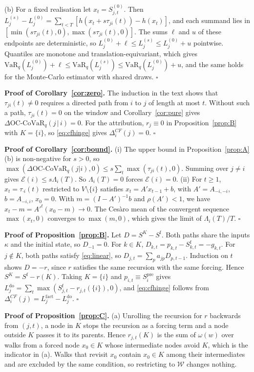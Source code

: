 \documentclass[referee,pdflatex,sn-mathphys-ay]{sn-jnl}
\theoremstyle{thmstyleone}%
\theoremstyle{thmstyletwo}%
\theoremstyle{thmstylethree}%
\newcommand{\doop}{\mathrm{do}}
\newcommand{\VaR}{\mathrm{VaR}}
\newcommand{\OCCoVaR}{\text{OC-CoVaR}}
\begin{document}
\begin{appendices}
(b) For a fixed realisation let $x_t=S^{(0)}_{j,t}$. Then $L_j^{(s)}-L_j^{(0)}=\sum_{t<T}[h(x_t+s\tau_{ji}(t))-h(x_t)]$, and each summand lies in $[\min(s\tau_{ji}(t),0),\max(s\tau_{ji}(t),0)]$. The sums $\ell$ and $u$ of these endpoints are deterministic, so $L_j^{(0)}+\ell\le L_j^{(s)}\le L_j^{(0)}+u$ pointwise. Quantiles are monotone and translation-equivariant, which gives $\VaR_q(L^{(0)}_j)+\ell\le\VaR_q(L^{(s)}_j)\le\VaR_q(L^{(0)}_j)+u$, and the same holds for the Monte-Carlo estimator with shared draws. \hfill$\square$

\noindent\textbf{Proof of Corollary~\ref{cor:zero}.} The induction in the text shows that $\tau_{ji}(t)\neq0$ requires a directed path from $i$ to $j$ of length at most $t$. Without such a path, $\tau_{ji}(t)=0$ on the window and Corollary~\ref{cor:pure} gives $\Delta\OCCoVaR_q(j\,|\,i)=0$. For the attribution, $r_j\equiv0$ in Proposition~\ref{prop:B} with $K=\{i\}$, so \eqref{eq:cfhinge} gives $\Delta_i^{CF}(j)=0$. \hfill$\square$

\noindent\textbf{Proof of Corollary~\ref{cor:bound}.} (i) The upper bound in Proposition~\ref{prop:A}(b) is non-negative for $s>0$, so
$\max(\Delta\OCCoVaR_q(j|i),0)\le s\sum_t\max(\tau_{ji}(t),0)$. Summing over $j\neq i$ gives $\mathcal{E}(i)\le s\Lambda_i(T)$.
So $\Lambda_i(T)=0$ forces $\mathcal{E}(i)=0$.
(ii) For $t\ge1$, $x_t=\tau_{\cdot i}(t)$ restricted to $V\setminus\{i\}$ satisfies $x_t=A'x_{t-1}+b$, with $A'=A_{-i,-i}$, $b=A_{-i,i}$, $x_0=0$.
With $m=(I-A')^{-1}b$ and $\rho(A')<1$, we have $x_t-m=A'^t(x_0-m)\to0$. The Cesàro mean of the
convergent sequence $\max(x_t,0)$ converges to $\max(m,0)$, which gives the limit of
$\Lambda_i(T)/T$. \hfill$\square$

\noindent\textbf{Proof of Proposition~\ref{prop:B}.} Let $D=S^K-S^{\mathrm f}$. Both paths
share the inputs $\kappa$ and the initial state, so $D_{-1}=0$. For $k\in K$,
$D_{k,t}=p_{k,t}-S^{\mathrm f}_{k,t}=-g_{k,t}$. For $j\notin K$, both paths satisfy
\eqref{eq:linear}, so $D_{j,t}=\sum_pa_{jp}D_{p,t-1}$. Induction on $t$ shows $D=-r$, since
$r$ satisfies the same recursion with the same forcing. Hence $S^K=S^{\mathrm f}-r(K)$.
Taking $K=\{i\}$ and $p_{i,t}\equiv S_i^{\mathrm{pre}}$ gives $L_j^{\doop}=\sum_t\max(S^{\mathrm f}_{j,t}-r_{j,t}(\{i\}),0)$,
and \eqref{eq:cfhinge} follows from $\Delta_i^{CF}(j)=L_j^{\mathrm{fact}}-L_j^{\doop}$. \hfill$\square$

\noindent\textbf{Proof of Proposition~\ref{prop:C}.} (a) Unrolling the recursion for $r$ backwards from $(j,t)$, a node in $K$ stops the recursion as a forcing term and a node outside $K$ passes it to its parents. Hence $r_{j,t}(K)$ is the sum of $\omega(w)$ over walks from a forced node $x_0\in K$ whose intermediate nodes avoid $K$, which is the indicator in (a). Walks that revisit $x_0$ contain $x_0\in K$ among their intermediates and are excluded by the same condition, so restricting to $\mathcal W$ changes nothing.


\end{appendices}
\end{document}
